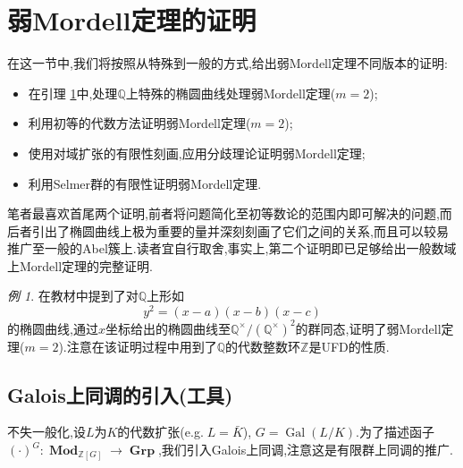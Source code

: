 \documentclass[12pt,A4paper,oneside,reqno]{amsart}
\numberwithin{equation}{section}
\theoremstyle{definition}
\theoremstyle{plain}
\theoremstyle{plain}
\numberwithin{equation}{section}
\theoremstyle{remark}
\newtheorem{eg}[theorem]{例}
\newcommand{\Mod}{\operatorname{\textbf{Mod}}}
\newcommand{\Gal}{\operatorname{Gal}}
\newcommand{\Grp}{\operatorname{\textbf{Grp}}}
\begin{document}
\section{弱Mordell定理的证明}
在这一节中,我们将按照从特殊到一般的方式,给出弱Mordell定理不同版本的证明:
\begin{itemize}
	\item 在引理 \ref{eg:weakMT}中,处理$\mathbb{Q}$上特殊的椭圆曲线处理弱Mordell定理($m=2$);
	\item 利用初等的代数方法证明弱Mordell定理($m=2$);
	\item 使用对域扩张的有限性刻画,应用分歧理论证明弱Mordell定理;
	\item 利用Selmer群的有限性证明弱Mordell定理.
\end{itemize}
笔者最喜欢首尾两个证明,前者将问题简化至初等数论的范围内即可解决的问题,而后者引出了椭圆曲线上极为重要的量并深刻刻画了它们之间的关系,而且可以较易推广至一般的Abel簇上.读者宜自行取舍,事实上,第二个证明即已足够给出一般数域上Mordell定理的完整证明.
\begin{eg}\label{eg:weakMT}
	在教材\cite{fermat2013dream}中提到了对$\mathbb{Q}$上形如
	\begin{equation}\label{eq:ellsplit}
	y^2=(x-a)(x-b)(x-c)
	\end{equation}
	的椭圆曲线,通过$x$坐标给出的椭圆曲线至$\mathbb{Q}^{\times}/(\mathbb{Q}^{\times})^2$的群同态,证明了弱Mordell定理($m=2$).注意在该证明过程中用到了$\mathbb{Q}$的代数整数环$\mathbb{Z}$是UFD的性质.
\end{eg}
\subsection{Galois上同调的引入(工具)}\phantom{1}

不失一般化,设$L$为$K$的代数扩张(e.g.$\;L=\bar{K}$), $G=\Gal(L/K)$.为了描述函子$(\cdot)^G: \Mod_{\mathbb{Z}[G]} \longrightarrow \Grp$,我们引入Galois上同调,注意这是有限群上同调的推广.
\end{document}
